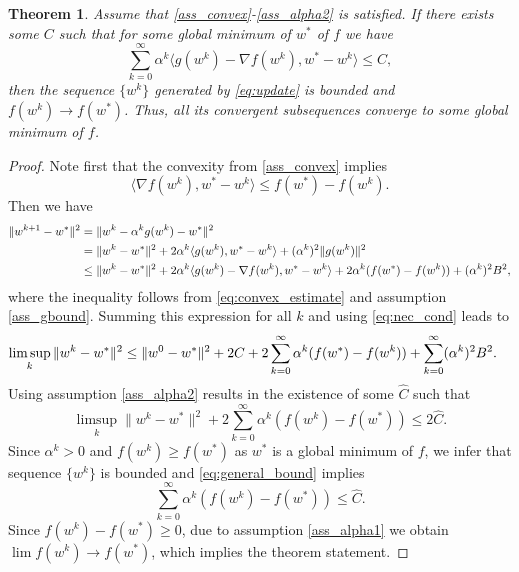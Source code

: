 \documentclass[]{interact}
\theoremstyle{plain}%
\newtheorem{theorem}{Theorem}[section]
\theoremstyle{definition}
\theoremstyle{remark}
\newcommand{\norm}[1]{\|#1\|}
\begin{document}
\begin{theorem}\label{thm:convergence}
Assume that \ref{ass_convex}-\ref{ass_alpha2} is satisfied. If there exists some $C$ such that for some global minimum of $w^*$ of $f$ we have
\begin{equation}\label{eq:nec_cond}
\sum_{k=0}^\infty\alpha^k\langle g(w^k)-\nabla f(w^k),w^*-w^k\rangle\le C,
\end{equation}
then the sequence $\{w^k\}$ generated by \eqref{eq:update} is bounded and $f(w^k)\to f(w^*)$. Thus, all its convergent subsequences converge to some global minimum of $f$.
\end{theorem}
\begin{proof}
Note first that the convexity from \ref{ass_convex} implies
\begin{equation}\label{eq:convex_estimate}
\langle \nabla f(w^k),w^*-w^k\rangle\le f(w^*)-f(w^k).
\end{equation}
Then we have
$$
\aligned
\norm{w^{k+1}-w^*}^2 &= \norm{w^k-\alpha^kg(w^k)-w^*}^2 \\
&=\norm{w^k-w^*}^2 + 2\alpha^k\langle g(w^k),w^*-w^k\rangle + (\alpha^k)^2\norm{g(w^k)}^2 \\
&\le \norm{w^k-w^*}^2 + 2\alpha^k\langle g(w^k)-\nabla f(w^k),w^*-w^k\rangle + 2\alpha^k(f(w^*)-f(w^k)) + (\alpha^k)^2B^2,
\endaligned
$$
where the inequality follows from \eqref{eq:convex_estimate} and assumption \ref{ass_gbound}. Summing this expression for all $k$ and using \eqref{eq:nec_cond} leads to
$$
\aligned
\limsup_k\norm{w^k-w^*}^2 &\le \norm{w^0-w^*}^2 +2C + 2\sum_{k=0}^\infty\alpha^k(f(w^*)-f(w^k)) + \sum_{k=0}^\infty(\alpha^k)^2B^2.
\endaligned
$$
Using assumption \ref{ass_alpha2} results in the existence of some $\hat C$ such that
\begin{equation}\label{eq:general_bound}
\limsup_k\norm{w^k-w^*}^2 + 2\sum_{k=0}^\infty\alpha^k(f(w^k) - f(w^*)) \le 2\hat C.
\end{equation}
Since $\alpha^k>0$ and $f(w^k)\ge f(w^*)$ as $w^*$ is a global minimum of $f$, we infer that sequence $\{w^k\}$ is bounded and \eqref{eq:general_bound} implies
$$
\sum_{k=0}^\infty\alpha^k(f(w^k) - f(w^*)) \le \hat C.
$$
Since $f(w^k)-f(w^*)\ge 0$, due to assumption \ref{ass_alpha1} we obtain $\lim f(w^k)\to f(w^*)$, which implies the theorem statement.
\end{proof}
\end{document}
